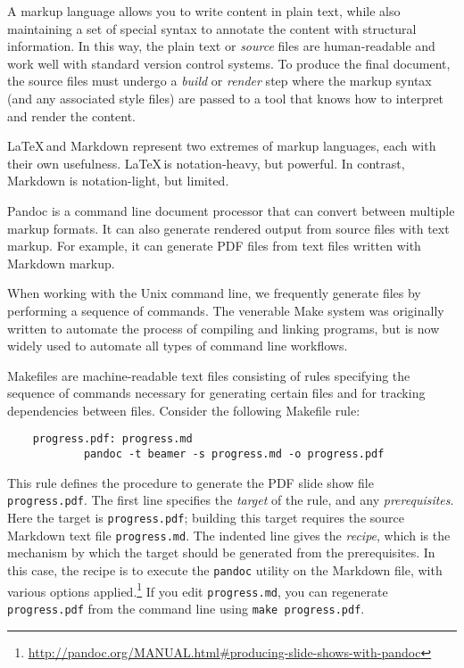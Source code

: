 A markup language allows you to write content in plain text, while also
maintaining a set of special syntax to annotate the content with structural
information.
In this way, the plain text or \emph{source} files are human-readable and work
well with standard version control systems.
To produce the final document, the source files must undergo a \emph{build} or
\emph{render}
step where the markup syntax (and any associated style files) are passed to a
tool that knows how to interpret and render the content.

\LaTeX\,and Markdown represent two extremes of markup languages, each
with their own usefulness.
\LaTeX\,is notation-heavy, but powerful.
In contrast, Markdown is notation-light, but limited.

Pandoc is a command line document processor that can convert between multiple
markup formats.  It can also generate rendered output from source files with
text markup.  For example, it can generate PDF files from text files written
with Markdown markup.

When working with the Unix command line, we frequently generate files
by performing a sequence of commands.
The venerable Make system was originally written to automate the process
of compiling and linking programs, but is now widely used to
automate all types of command line workflows.

Makefiles are machine-readable text files consisting of rules
specifying the sequence of commands necessary for generating
certain files and for tracking dependencies between files.
Consider the following Makefile rule:
\begin{verbatim}
    progress.pdf: progress.md
            pandoc -t beamer -s progress.md -o progress.pdf
\end{verbatim}
This rule defines the procedure to generate the PDF slide show file
\texttt{progress.pdf}. The first line specifies the \textit{target} of the
rule, and any \textit{prerequisites}.  Here the target is
\texttt{progress.pdf}; building this target requires the source
Markdown text file \texttt{progress.md}. The indented line gives the
\textit{recipe}, which is the mechanism by which the target
should be generated from the prerequisites.  In this case, the recipe is to
execute the \texttt{pandoc} utility on the Markdown file, with various options
applied.\footnote{\url{http://pandoc.org/MANUAL.html\#producing-slide-shows-with-pandoc}}
If you edit \texttt{progress.md}, you can regenerate \texttt{progress.pdf}
from the command line using \texttt{make progress.pdf}.

